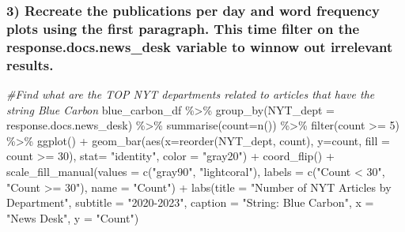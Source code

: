 \documentclass[
]{article}
\newenvironment{Shaded}{\begin{snugshade}}{\end{snugshade}}
\newcommand{\AttributeTok}[1]{\textcolor[rgb]{0.77,0.63,0.00}{#1}}
\newcommand{\CommentTok}[1]{\textcolor[rgb]{0.56,0.35,0.01}{\textit{#1}}}
\newcommand{\DecValTok}[1]{\textcolor[rgb]{0.00,0.00,0.81}{#1}}
\newcommand{\FunctionTok}[1]{\textcolor[rgb]{0.00,0.00,0.00}{#1}}
\newcommand{\NormalTok}[1]{#1}
\newcommand{\SpecialCharTok}[1]{\textcolor[rgb]{0.00,0.00,0.00}{#1}}
\newcommand{\StringTok}[1]{\textcolor[rgb]{0.31,0.60,0.02}{#1}}
\begin{document}
\hypertarget{recreate-the-publications-per-day-and-word-frequency-plots-using-the-first-paragraph.-this-time-filter-on-the-response.docs.news_desk-variable-to-winnow-out-irrelevant-results.}{%
\subsubsection{3) Recreate the publications per day and word frequency
plots using the first paragraph. This time filter on the
response.docs.news\_desk variable to winnow out irrelevant
results.}\label{recreate-the-publications-per-day-and-word-frequency-plots-using-the-first-paragraph.-this-time-filter-on-the-response.docs.news_desk-variable-to-winnow-out-irrelevant-results.}}

\begin{Shaded}
\begin{Highlighting}[]
\CommentTok{\#Find what are the TOP NYT departments related to articles that have the string Blue Carbon}
\NormalTok{blue\_carbon\_df }\SpecialCharTok{\%\textgreater{}\%}
  \FunctionTok{group\_by}\NormalTok{(}\AttributeTok{NYT\_dept =}\NormalTok{ response.docs.news\_desk) }\SpecialCharTok{\%\textgreater{}\%}
  \FunctionTok{summarise}\NormalTok{(}\AttributeTok{count=}\FunctionTok{n}\NormalTok{()) }\SpecialCharTok{\%\textgreater{}\%}
  \FunctionTok{filter}\NormalTok{(count }\SpecialCharTok{\textgreater{}=} \DecValTok{5}\NormalTok{) }\SpecialCharTok{\%\textgreater{}\%}
  \FunctionTok{ggplot}\NormalTok{() }\SpecialCharTok{+}
  \FunctionTok{geom\_bar}\NormalTok{(}\FunctionTok{aes}\NormalTok{(}\AttributeTok{x=}\FunctionTok{reorder}\NormalTok{(NYT\_dept, count), }\AttributeTok{y=}\NormalTok{count, }\AttributeTok{fill =}\NormalTok{ count }\SpecialCharTok{\textgreater{}=} \DecValTok{30}\NormalTok{), }
           \AttributeTok{stat=} \StringTok{"identity"}\NormalTok{, }\AttributeTok{color =} \StringTok{"gray20"}\NormalTok{) }\SpecialCharTok{+}
  \FunctionTok{coord\_flip}\NormalTok{() }\SpecialCharTok{+}
  \FunctionTok{scale\_fill\_manual}\NormalTok{(}\AttributeTok{values =} \FunctionTok{c}\NormalTok{(}\StringTok{"gray90"}\NormalTok{, }\StringTok{"lightcoral"}\NormalTok{), }
                    \AttributeTok{labels =} \FunctionTok{c}\NormalTok{(}\StringTok{"Count \textless{} 30"}\NormalTok{, }\StringTok{"Count \textgreater{}= 30"}\NormalTok{), }
                    \AttributeTok{name =} \StringTok{"Count"}\NormalTok{) }\SpecialCharTok{+}
  \FunctionTok{labs}\NormalTok{(}\AttributeTok{title =} \StringTok{"Number of NYT Articles by Department"}\NormalTok{,}
       \AttributeTok{subtitle =} \StringTok{"2020{-}2023"}\NormalTok{,}
       \AttributeTok{caption =} \StringTok{"String: \textquotesingle{}Blue Carbon\textquotesingle{}"}\NormalTok{,}
       \AttributeTok{x =} \StringTok{"News Desk"}\NormalTok{,}
       \AttributeTok{y =} \StringTok{"Count"}\NormalTok{)}
\end{Highlighting}
\end{Shaded}
\end{document}
